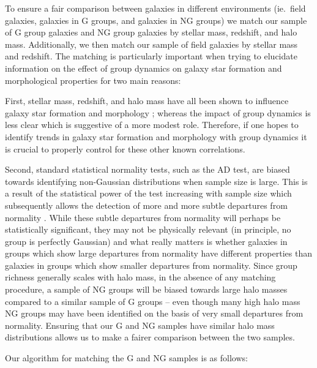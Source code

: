 \documentclass[a4paper,fleqn,usenatbib]{mnras}
\begin{document}
To ensure a fair comparison between galaxies in different environments
(ie.\ field galaxies, galaxies in G groups, and galaxies in NG groups)
we match our sample of G group galaxies and NG group galaxies by
stellar mass, redshift, and halo mass.  Additionally, we then match
our sample of field galaxies by stellar mass and redshift.  The
matching is particularly important when trying to elucidate
information on the effect of group dynamics on galaxy star formation and
morphological properties for
two main reasons:
\par
First, stellar mass, redshift, and halo mass have
all been shown to influence galaxy star formation and morphology
\citep[e.g.][]{brinchmann2004, feulner2005, zheng2007, cucciati2012,
  wetzel2012, lackner2013, tasca2014}; whereas
the impact of group dynamics is less clear \citep{hou2013,
  ribeiro2013} which is suggestive of a more modest role.
Therefore,
if one hopes to identify trends in galaxy star formation and morphology with group
dynamics it is crucial to properly control for these other known correlations.
\par
Second, standard statistical normality tests, such as the AD test, are
biased towards identifying non-Gaussian distributions when
sample size is large.  This is a result of the statistical power of
the test increasing with sample size which subsequently allows the
detection of more and more subtle departures from normality
\citep{razali2011}.  While these subtle departures from normality will
perhaps be statistically significant, they may not be physically relevant (in
principle, no group is perfectly Gaussian) and what really matters is
whether galaxies in groups which show large departures from normality
have different properties than galaxies in groups which show smaller
departures from normality. Since group
richness generally scales with halo mass, in the absence of any matching
procedure, a sample of NG groups will be biased towards large halo
masses compared to a similar sample of G groups -- even though many
high halo mass NG groups may have been identified on the basis of very
small departures from normality.  Ensuring that our G and NG
samples have similar halo mass distributions allows us to make a
fairer comparison between the two samples.
\par
Our algorithm for matching the G and NG samples is as follows:
\end{document}
